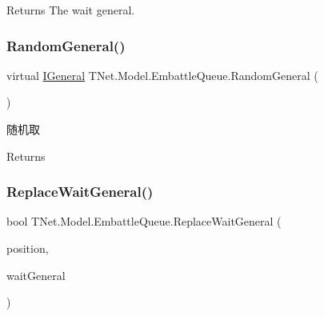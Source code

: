 \begin{DoxyReturn}{Returns}
The wait general.
\end{DoxyReturn}
\mbox{\label{class_t_net_1_1_model_1_1_embattle_queue_a5f40c4b5d05e4267105f18bfbda5e1ec}} 
\subsubsection{\texorpdfstring{Random\+General()}{RandomGeneral()}}
{\footnotesize\ttfamily virtual \mbox{\hyperlink{interface_t_net_1_1_model_1_1_i_general}{I\+General}} T\+Net.\+Model.\+Embattle\+Queue.\+Random\+General (\begin{DoxyParamCaption}{ }\end{DoxyParamCaption})\hspace{0.3cm}{\ttfamily [virtual]}}



随机取 

\begin{DoxyReturn}{Returns}

\end{DoxyReturn}
\mbox{\label{class_t_net_1_1_model_1_1_embattle_queue_a90e2405c7747f5763e3710a265bd8f3f}} 
\subsubsection{\texorpdfstring{Replace\+Wait\+General()}{ReplaceWaitGeneral()}}
{\footnotesize\ttfamily bool T\+Net.\+Model.\+Embattle\+Queue.\+Replace\+Wait\+General (\begin{DoxyParamCaption}\item[{int}]{position,  }\item[{out \mbox{\hyperlink{interface_t_net_1_1_model_1_1_i_general}{I\+General}}}]{wait\+General }\end{DoxyParamCaption})}



